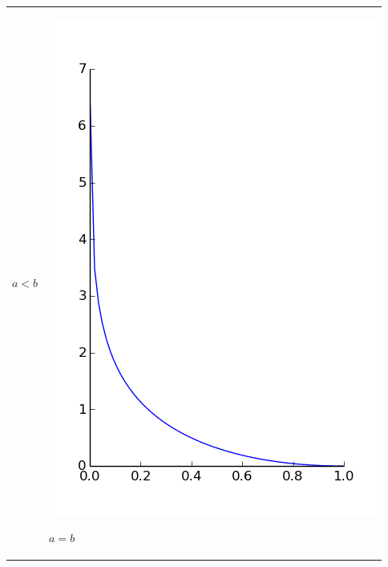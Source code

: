 \begin{tabular}{m{5cm} m{5cm}}
\begin{center}
$a<b$
\end{center}
&
\begin{center}
\includegraphics[scale=.3]{imagenes/perse_a_1_b_1.png}

$a=b$
\end{center}
\end{tabular}
